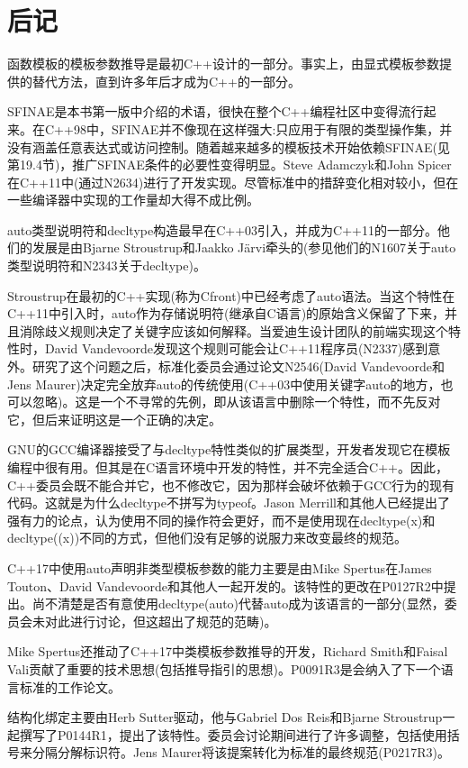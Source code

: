 \section{后记}
函数模板的模板参数推导是最初C++设计的一部分。事实上，由显式模板参数提供的替代方法，直到许多年后才成为C++的一部分。

SFINAE是本书第一版中介绍的术语，很快在整个C++编程社区中变得流行起来。在C++98中，SFINAE并不像现在这样强大:只应用于有限的类型操作集，并没有涵盖任意表达式或访问控制。随着越来越多的模板技术开始依赖SFINAE(见第19.4节)，推广SFINAE条件的必要性变得明显。Steve Adamczyk和John Spicer在C++11中(通过N2634)进行了开发实现。尽管标准中的措辞变化相对较小，但在一些编译器中实现的工作量却大得不成比例。

auto类型说明符和decltype构造最早在C++03引入，并成为C++11的一部分。他们的发展是由Bjarne Stroustrup和Jaakko J{\"a}rvi牵头的(参见他们的N1607关于auto类型说明符和N2343关于decltype)。

Stroustrup在最初的C++实现(称为Cfront)中已经考虑了auto语法。当这个特性在C++11中引入时，auto作为存储说明符(继承自C语言)的原始含义保留了下来，并且消除歧义规则决定了关键字应该如何解释。当爱迪生设计团队的前端实现这个特性时，David Vandevoorde发现这个规则可能会让C++11程序员(N2337)感到意外。研究了这个问题之后，标准化委员会通过论文N2546(David Vandevoorde和Jens Maurer)决定完全放弃auto的传统使用(C++03中使用关键字auto的地方，也可以忽略)。这是一个不寻常的先例，即从该语言中删除一个特性，而不先反对它，但后来证明这是一个正确的决定。

GNU的GCC编译器接受了与decltype特性类似的扩展类型，开发者发现它在模板编程中很有用。但其是在C语言环境中开发的特性，并不完全适合C++。因此，C++委员会既不能合并它，也不修改它，因为那样会破坏依赖于GCC行为的现有代码。这就是为什么decltype不拼写为typeof。Jason Merrill和其他人已经提出了强有力的论点，认为使用不同的操作符会更好，而不是使用现在decltype(x)和decltype((x))不同的方式，但他们没有足够的说服力来改变最终的规范。

C++17中使用auto声明非类型模板参数的能力主要是由Mike Spertus在James Touton、David Vandevoorde和其他人一起开发的。该特性的更改在P0127R2中提出。尚不清楚是否有意使用decltype(auto)代替auto成为该语言的一部分(显然，委员会未对此进行讨论，但这超出了规范的范畴)。

Mike Spertus还推动了C++17中类模板参数推导的开发，Richard Smith和Faisal Vali贡献了重要的技术思想(包括推导指引的思想)。P0091R3是会纳入了下一个语言标准的工作论文。

结构化绑定主要由Herb Sutter驱动，他与Gabriel Dos Reis和Bjarne Stroustrup一起撰写了P0144R1，提出了该特性。委员会讨论期间进行了许多调整，包括使用括号来分隔分解标识符。Jens Maurer将该提案转化为标准的最终规范(P0217R3)。





